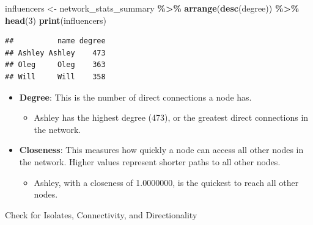 \documentclass[
]{article}
\newenvironment{Shaded}{\begin{snugshade}}{\end{snugshade}}
\newcommand{\ControlFlowTok}[1]{\textcolor[rgb]{0.13,0.29,0.53}{\textbf{#1}}}
\newcommand{\DecValTok}[1]{\textcolor[rgb]{0.00,0.00,0.81}{#1}}
\newcommand{\FunctionTok}[1]{\textcolor[rgb]{0.13,0.29,0.53}{\textbf{#1}}}
\newcommand{\NormalTok}[1]{#1}
\newcommand{\OtherTok}[1]{\textcolor[rgb]{0.56,0.35,0.01}{#1}}
\newcommand{\SpecialCharTok}[1]{\textcolor[rgb]{0.81,0.36,0.00}{\textbf{#1}}}
\providecommand{\tightlist}{%
  \setlength{\itemsep}{0pt}\setlength{\parskip}{0pt}}
\begin{document}
\begin{Shaded}
\begin{Highlighting}[]
\NormalTok{influencers }\OtherTok{\textless{}{-}}\NormalTok{ network\_stats\_summary }\SpecialCharTok{\%\textgreater{}\%}
  \FunctionTok{arrange}\NormalTok{(}\FunctionTok{desc}\NormalTok{(degree)) }\SpecialCharTok{\%\textgreater{}\%}
  \FunctionTok{head}\NormalTok{(}\DecValTok{3}\NormalTok{) }
\FunctionTok{print}\NormalTok{(influencers)}
\end{Highlighting}
\end{Shaded}

\begin{verbatim}
##          name degree
## Ashley Ashley    473
## Oleg     Oleg    363
## Will     Will    358
\end{verbatim}

\begin{itemize}
\item
  \textbf{Degree}: This is the number of direct connections a node has.

  \begin{itemize}
  \tightlist
  \item
    Ashley has the highest degree (473), or the greatest direct
    connections in the network.
  \end{itemize}
\item
  \textbf{Closeness}: This measures how quickly a node can access all
  other nodes in the network. Higher values represent shorter paths to
  all other nodes.

  \begin{itemize}
  \tightlist
  \item
    Ashley, with a closeness of 1.0000000, is the quickest to reach all
    other nodes.
  \end{itemize}
\end{itemize}

Check for Isolates, Connectivity, and Directionality

\begin{Shaded}
\end{Shaded}
\end{document}
